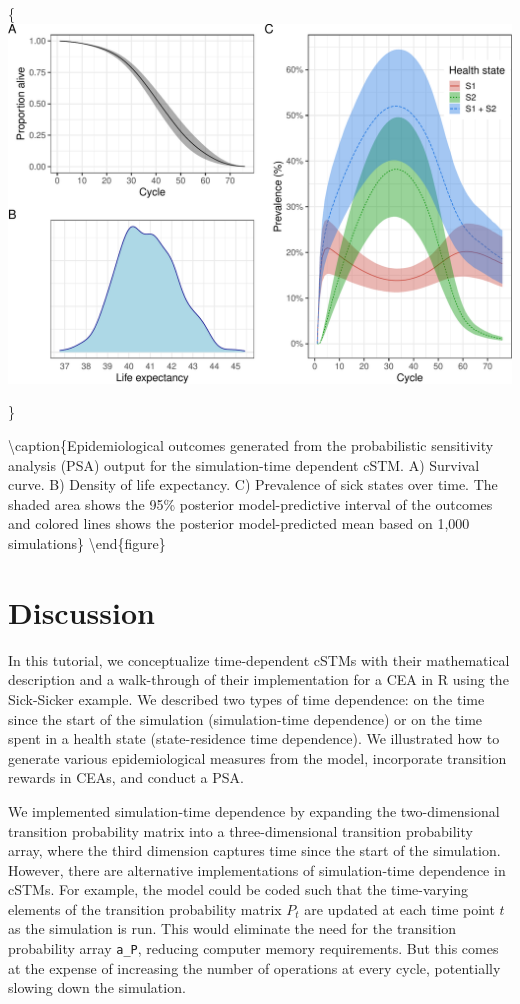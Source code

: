\documentclass[
]{article}
\begin{document}
\{\centering \includegraphics{figs/PSA-EPI-figures-1}

\}

\textbackslash caption\{Epidemiological outcomes generated from the probabilistic sensitivity analysis (PSA) output for the simulation-time dependent cSTM. A) Survival curve. B) Density of life expectancy. C) Prevalence of sick states over time. The shaded area shows the 95\% posterior model-predictive interval of the outcomes and colored lines shows the posterior model-predicted mean based on 1,000 simulations\}\label{fig:PSA-EPI-figures}
\textbackslash end\{figure\}

\hypertarget{discussion}{%
\section{Discussion}\label{discussion}}

In this tutorial, we conceptualize time-dependent cSTMs with their mathematical description and a walk-through of their implementation for a CEA in R using the Sick-Sicker example. We described two types of time dependence: on the time since the start of the simulation (simulation-time dependence) or on the time spent in a health state (state-residence time dependence). We illustrated how to generate various epidemiological measures from the model, incorporate transition rewards in CEAs, and conduct a PSA.

We implemented simulation-time dependence by expanding the two-dimensional transition probability matrix into a three-dimensional transition probability array, where the third dimension captures time since the start of the simulation. However, there are alternative implementations of simulation-time dependence in cSTMs. For example, the model could be coded such that the time-varying elements of the transition probability matrix \(P_t\) are updated at each time point \(t\) as the simulation is run. This would eliminate the need for the transition probability array \texttt{a\_P}, reducing computer memory requirements. But this comes at the expense of increasing the number of operations at every cycle, potentially slowing down the simulation.
\end{document}
